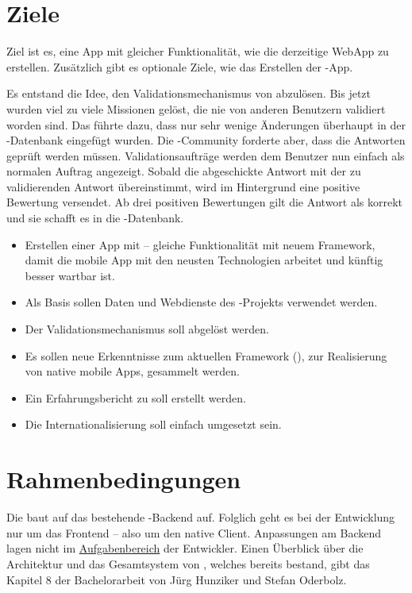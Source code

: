 \section{Ziele}
\label{tb-einfuehrung-ziele}
Ziel ist es, eine  App mit gleicher Funktionalität, wie die derzeitige \gls{WebApp} zu erstellen.
Zusätzlich gibt es optionale Ziele, wie das Erstellen der -App.

Es entstand die Idee, den Validationsmechanismus von \kort{} abzulösen.
Bis jetzt wurden viel zu viele Missionen gelöst, die nie von anderen Benutzern validiert worden sind.
Das führte dazu, dass nur sehr wenige Änderungen überhaupt in der -Datenbank eingefügt wurden.
Die -Community forderte aber, dass die Antworten geprüft werden müssen.
Validationsaufträge werden dem Benutzer nun einfach als normalen Auftrag angezeigt.
Sobald die abgeschickte Antwort mit der zu validierenden Antwort übereinstimmt, wird im Hintergrund eine positive Bewertung versendet.
Ab drei positiven Bewertungen gilt die Antwort als korrekt und sie schafft es in die -Datenbank.

\begin{itemize}
	\item Erstellen einer  App mit  -- gleiche Funktionalität mit neuem Framework, damit die mobile App mit den neusten Technologien arbeitet und künftig besser wartbar ist.
	\item Als Basis sollen Daten und Webdienste des -Projekts verwendet werden.
	\item Der Validationsmechanismus soll abgelöst werden.
	\item Es sollen neue Erkenntnisse zum aktuellen Framework (), zur Realisierung von native mobile Apps, gesammelt werden.
	\item Ein Erfahrungsbericht zu  soll erstellt werden.
	\item Die Internationalisierung soll einfach umgesetzt sein.
\end{itemize}

\section{Rahmenbedingungen}
Die  baut auf das bestehende \kort{}-Backend auf.  
Folglich geht es bei der Entwicklung nur um das Frontend -- also um den native Client.
Anpassungen am Backend lagen nicht im \hyperref[pd-anforderungsspezifikation]{Aufgabenbereich} der Entwickler.
Einen Überblick über die Architektur und das Gesamtsystem von \kort{}, welches bereits bestand, gibt das Kapitel 8 der Bachelorarbeit von Jürg Hunziker und Stefan Oderbolz.\cite{ba-kort-2012}

